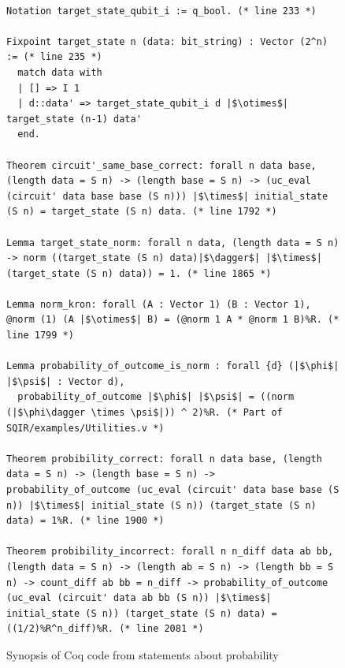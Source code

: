 \documentclass{article}
\begin{document}
\begin{figure}[H]
    \centering
\begin{verbatim}

Notation target_state_qubit_i := q_bool. (* line 233 *)

Fixpoint target_state n (data: bit_string) : Vector (2^n) := (* line 235 *)
  match data with
  | [] => I 1
  | d::data' => target_state_qubit_i d |$\otimes$| target_state (n-1) data'
  end.
  
Theorem circuit'_same_base_correct: forall n data base, (length data = S n) -> (length base = S n) -> (uc_eval (circuit' data base base (S n))) |$\times$| initial_state (S n) = target_state (S n) data. (* line 1792 *)

Lemma target_state_norm: forall n data, (length data = S n) -> norm ((target_state (S n) data)|$\dagger$| |$\times$| (target_state (S n) data)) = 1. (* line 1865 *)

Lemma norm_kron: forall (A : Vector 1) (B : Vector 1), @norm (1) (A |$\otimes$| B) = (@norm 1 A * @norm 1 B)%R. (* line 1799 *)

Lemma probability_of_outcome_is_norm : forall {d} (|$\phi$| |$\psi$| : Vector d),
  probability_of_outcome |$\phi$| |$\psi$| = ((norm (|$\phi\dagger \times \psi$|)) ^ 2)%R. (* Part of SQIR/examples/Utilities.v *)

Theorem probibility_correct: forall n data base, (length data = S n) -> (length base = S n) -> probability_of_outcome (uc_eval (circuit' data base base (S n)) |$\times$| initial_state (S n)) (target_state (S n) data) = 1%R. (* line 1900 *)

Theorem probibility_incorrect: forall n n_diff data ab bb, (length data = S n) -> (length ab = S n) -> (length bb = S n) -> count_diff ab bb = n_diff -> probability_of_outcome (uc_eval (circuit' data ab bb (S n)) |$\times$| initial_state (S n)) (target_state (S n) data) = ((1/2)%R^n_diff)%R. (* line 2081 *)
\end{verbatim}
    \caption{Synopsis of Coq code from statements about probability}
    \label{fig:circuit-prob}
\end{figure}



\end{document}
